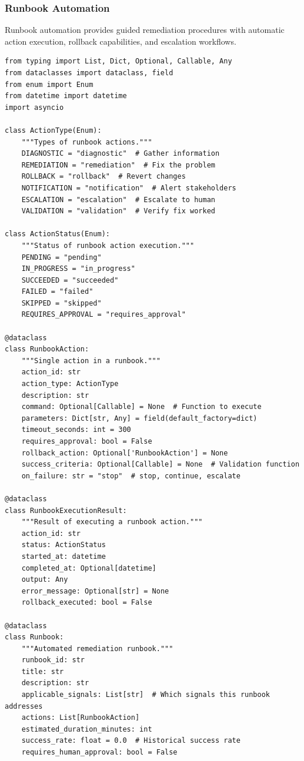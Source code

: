 \subsubsection{Runbook Automation}

Runbook automation provides guided remediation procedures with automatic action execution, rollback capabilities, and escalation workflows.

\begin{lstlisting}[style=python, caption={Runbook automation with guided remediation}]
from typing import List, Dict, Optional, Callable, Any
from dataclasses import dataclass, field
from enum import Enum
from datetime import datetime
import asyncio

class ActionType(Enum):
    """Types of runbook actions."""
    DIAGNOSTIC = "diagnostic"  # Gather information
    REMEDIATION = "remediation"  # Fix the problem
    ROLLBACK = "rollback"  # Revert changes
    NOTIFICATION = "notification"  # Alert stakeholders
    ESCALATION = "escalation"  # Escalate to human
    VALIDATION = "validation"  # Verify fix worked

class ActionStatus(Enum):
    """Status of runbook action execution."""
    PENDING = "pending"
    IN_PROGRESS = "in_progress"
    SUCCEEDED = "succeeded"
    FAILED = "failed"
    SKIPPED = "skipped"
    REQUIRES_APPROVAL = "requires_approval"

@dataclass
class RunbookAction:
    """Single action in a runbook."""
    action_id: str
    action_type: ActionType
    description: str
    command: Optional[Callable] = None  # Function to execute
    parameters: Dict[str, Any] = field(default_factory=dict)
    timeout_seconds: int = 300
    requires_approval: bool = False
    rollback_action: Optional['RunbookAction'] = None
    success_criteria: Optional[Callable] = None  # Validation function
    on_failure: str = "stop"  # stop, continue, escalate

@dataclass
class RunbookExecutionResult:
    """Result of executing a runbook action."""
    action_id: str
    status: ActionStatus
    started_at: datetime
    completed_at: Optional[datetime]
    output: Any
    error_message: Optional[str] = None
    rollback_executed: bool = False

@dataclass
class Runbook:
    """Automated remediation runbook."""
    runbook_id: str
    title: str
    description: str
    applicable_signals: List[str]  # Which signals this runbook addresses
    actions: List[RunbookAction]
    estimated_duration_minutes: int
    success_rate: float = 0.0  # Historical success rate
    requires_human_approval: bool = False


\end{lstlisting}
